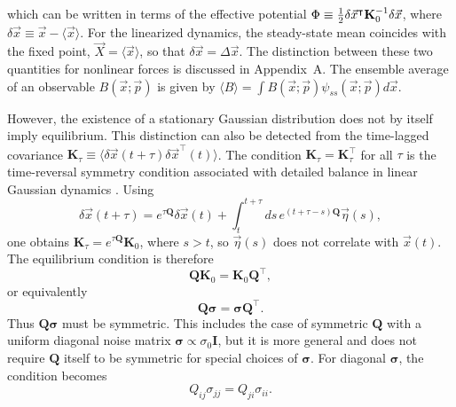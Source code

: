 which can be written in terms of the effective potential $\Phi \equiv \frac{1}{2} \delta \vec{x}^\intercal {\bf K}^{-1}_0 \delta \vec{x}$, where $\delta \vec{x} \equiv \vec{x} - \langle \vec{x} \rangle$. For the linearized dynamics, the steady-state mean coincides with the fixed point, $\vec{X}=\langle \vec{x} \rangle$, so that $\delta \vec{x} = \Delta \vec{x}$. The distinction between these two quantities for nonlinear forces is discussed in Appendix~A. The ensemble average of an observable $B(\vec{x}; \vec{p})$ is given by $\langle B \rangle = \int B(\vec{x}; \vec{p}) \psi_{ss}(\vec{x}; \vec{p}) d\vec{x}$.\par
However, the existence of a stationary Gaussian distribution does not by itself imply equilibrium. This distinction can also be detected from the time-lagged covariance $\mathbf{K}_{\tau} \equiv \langle \delta \vec{x}(t+\tau) \delta \vec{x}^\intercal(t) \rangle$. The condition $\mathbf{K}_\tau = \mathbf{K}^{\intercal}_\tau$ for all $\tau$ is the time-reversal symmetry condition associated with detailed balance in linear Gaussian dynamics \cite{PhysRevE.110.034313}. Using
\begin{equation}
    \delta \vec{x}(t+\tau) = e^{\tau \mathbf{Q}} \delta \vec{x}(t) + \int_t^{t+\tau} ds\, e^{(t+\tau-s)\mathbf{Q}} \vec{\eta}(s),
\end{equation}
one obtains $\mathbf{K}_\tau = e^{\tau \mathbf{Q}}\mathbf{K}_0$, where $s > t$, so $\vec{\eta}(s)$ does not correlate with $\vec{x}(t)$. The equilibrium condition is therefore
\begin{equation}
    \mathbf{Q}\mathbf{K}_0 = \mathbf{K}_0\mathbf{Q}^\intercal,
\end{equation}
or equivalently
\begin{equation}
    \mathbf{Q}\boldsymbol{\sigma} = \boldsymbol{\sigma}\mathbf{Q}^\intercal.
    \label{equilibrium_condition}
\end{equation}
Thus $\mathbf{Q}\boldsymbol{\sigma}$ must be symmetric. This includes the case of symmetric $\mathbf{Q}$ with a uniform diagonal noise matrix $\boldsymbol{\sigma}\propto \sigma_0 \mathbf{I}$, but it is more general and does not require $\mathbf{Q}$ itself to be symmetric for special choices of $\boldsymbol{\sigma}$. For diagonal $\boldsymbol{\sigma}$, the condition becomes
\begin{equation}
    Q_{ij} \sigma_{jj} = Q_{ji} \sigma_{ii}.
    \label{equilibrium_condition_diagonal}
\end{equation}
